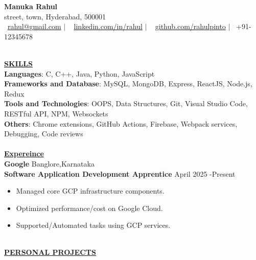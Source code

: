 \documentclass{article}
\begin{document}
\begin{center}
\thispagestyle{empty}
\large \textbf{Manuka Rahul \\}
\normalsize street, town, Hyderabad, 500001\\
\faEnvelope \  \href{mailto:rahulgmail.com}{rahul@gmail.com} $\mid$  
\faLinkedin~ \href{https://www.linkedin.com}{linkedin.com/in/rahul} $\mid$  
\faGithub~ \href{https://github.com/rahulpinto19/}{github.com/rahulpinto} $\mid$  
\faPhone \ +91-12345678 \\  
\hrulefill
{\\}
\end{center}



\noindent \textbf{\underline{SKILLS}} \\

\noindent\textbf{Languages}: C, C++, Java, Python, JavaScript\\
\textbf{Frameworks and Database}: MySQL, MongoDB, Express, ReactJS, Node.js, Redux \\
\textbf{Tools and Technologies}: OOPS, Data Structures, Git, Visual Studio Code, RESTful API, NPM, Websockets\\
\textbf{Others}: Chrome extensions, GitHub Actions, Firebase, Webpack services, Debugging, Code reviews\\
\\
\noindent \textbf{\underline{Expereince}} \\
\textbf{Google} \hfill Banglore,Karnataka \\
\textbf{Software Application Development Apprentice} \hfill April 2025 -Present 
\begin{itemize}[noitemsep,nolistsep,leftmargin=*]
\item Managed core GCP infrastructure components.
\item Optimized performance/cost on Google Cloud.
\item Supported/Automated tasks using GCP services.\\
\end{itemize}
\\

\noindent \textbf{\underline{PERSONAL PROJECTS}} \\
\end{document}
